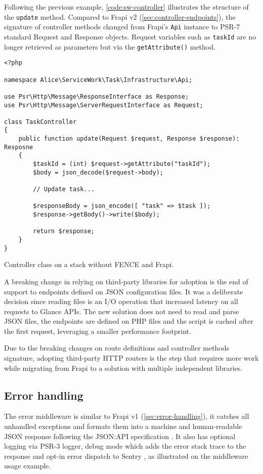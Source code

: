 Following the previous example, \autoref{code:sw-controller} illustrates the structure of the \texttt{update} method. Compared to Frapi v2 (\autoref{sec:controller-endpoints}), the signature of controller methods changed from Frapi's \texttt{Api} instance to PSR-7 standard Request and Response objects. Request variables such as \texttt{taskId} are no longer retrieved as parameters but via the \texttt{getAttribute()} method.

\begin{listing}[htbp]
\begin{verbatim}
<?php

namespace Alice\ServiceWork\Task\Infrastructure\Api;

use Psr\Http\Message\ResponseInterface as Response;
use Psr\Http\Message\ServerRequestInterface as Request;

class TaskController
{
	public function update(Request $request, Response $response): Resposne
	{
		$taskId = (int) $request->getAttribute("taskId");
		$body = json_decode($request->body);

		// Update task...

		$responseBody = json_encode([ "task" => $task ]);
		$response->getBody()->write($body);

		return $response;
	}
}
\end{verbatim}
\caption{Controller class on a stack without FENCE and Frapi.}
\label{code:sw-controller}
\end{listing}

A breaking change in relying on third-party libraries for adoption is the end of support to endpoints defined on JSON configuration files. It was a deliberate decision since reading files is an I/O operation that increased latency on all requests to Glance APIs. The new solution does not need to read and parse JSON files, the endpoints are defined on PHP files and the script is cached after the first request, leveraging a smaller performance footprint.

Due to the breaking changes on route definitions and controller methods signature, adopting third-party HTTP routers is the step that requires more work while migrating from Frapi to a solution with multiple independent libraries.

\subsection{Error handling}

The error middleware \cite{error-middleware} is similar to Frapi v1 (\autoref{sec:error-handling}), it catches all unhandled exceptions and formats them into a machine and human-readable JSON response following the JSON:API specification \cite{json-api-error}. It also has optional logging via PSR-3 logger, debug mode which adds the error stack trace to the response and opt-in error dispatch to Sentry \cite{sentry-about} \cite{sentry-php-sdk}, as illustrated on the middleware usage example.

